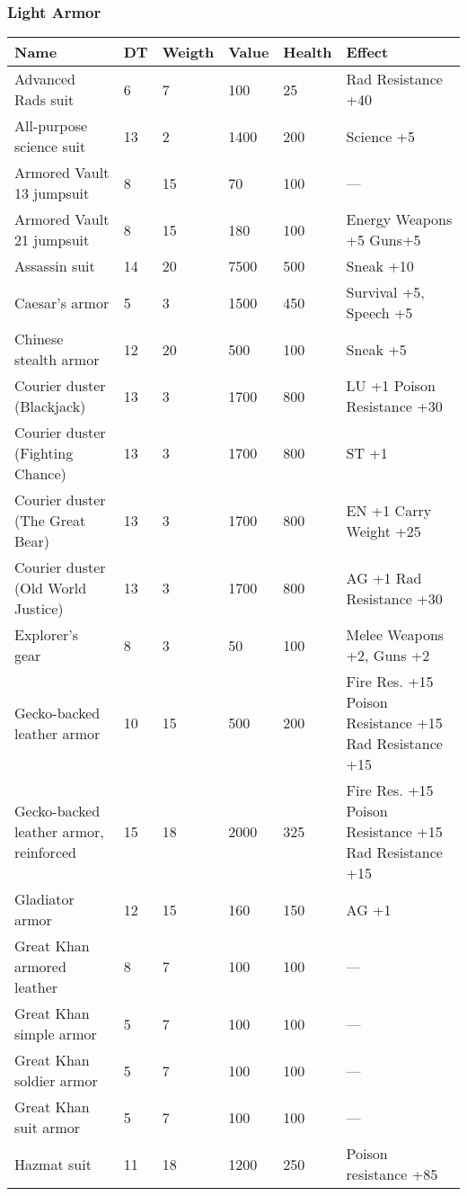 
\subsubsection{Light Armor}
\begin{longtable}{|p{4cm}|p{1.2cm}|p{1.2cm}|p{1.2cm}|p{1.2cm}|p{4cm}|}
\hline
\bfseries Name & \bfseries DT & \bfseries Weigth & \bfseries Value & \bfseries Health & \bfseries Effect \\
\hline
\endhead
Advanced Rads suit & 6 & 7 & 100 & 25 & Rad Resistance +40 \\
All-purpose science suit & 13 & 2 & 1400 & 200 & Science +5 \\
Armored Vault 13 jumpsuit & 8 & 15 & 70 & 100 & — \\
Armored Vault 21 jumpsuit & 8 & 15 & 180 & 100 & Energy Weapons +5 Guns+5 \\
Assassin suit & 14 & 20 & 7500 & 500 & Sneak +10 \\
Caesar's armor & 5 & 3 & 1500 & 450 & Survival +5, Speech +5 \\
Chinese stealth armor & 12 & 20 & 500 & 100 & Sneak +5 \\
Courier duster (Blackjack) & 13 & 3 & 1700 & 800 & LU +1 Poison Resistance +30 \\
Courier duster (Fighting Chance) & 13 & 3 & 1700 & 800 & ST +1 \\
Courier duster (The Great Bear) & 13 & 3 & 1700 & 800 & EN +1 Carry Weight +25 \\
Courier duster (Old World Justice) & 13 & 3 & 1700 & 800 & AG +1 Rad Resistance +30 \\
Explorer's gear & 8 & 3 & 50 & 100 & Melee Weapons +2, Guns +2 \\
Gecko-backed leather armor & 10 & 15 & 500 & 200 & Fire Res. +15 Poison Resistance +15 Rad Resistance +15 \\
Gecko-backed leather armor, reinforced & 15 & 18 & 2000 & 325 & Fire Res. +15 Poison Resistance +15 Rad Resistance +15 \\
Gladiator armor & 12 & 15 & 160 & 150 & AG +1 \\
Great Khan armored leather & 8 & 7 & 100 & 100 & — \\
Great Khan simple armor & 5 & 7 & 100 & 100 & — \\
Great Khan soldier armor & 5 & 7 & 100 & 100 & — \\
Great Khan suit armor & 5 & 7 & 100 & 100 & — \\
Hazmat suit & 11 & 18 & 1200 & 250 & Poison resistance +85 \\

\end{longtable}
